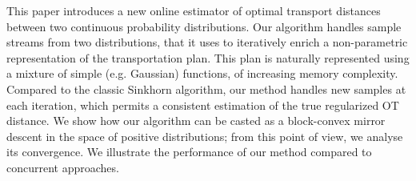This paper introduces a new online estimator of optimal transport distances
between two continuous probability distributions. Our algorithm handles sample
streams from two distributions, that it uses to iteratively enrich a
non-parametric representation of the transportation plan. This plan is naturally
represented using a mixture of simple (e.g. Gaussian) functions, of increasing
memory complexity. Compared to the classic Sinkhorn algorithm, our method
handles new samples at each iteration, which permits a consistent estimation of
the true regularized OT distance. We show how our algorithm can be casted as a
block-convex mirror descent in the space of positive distributions; from this
point of view, we analyse its convergence. We illustrate the performance of our
method compared to concurrent approaches.